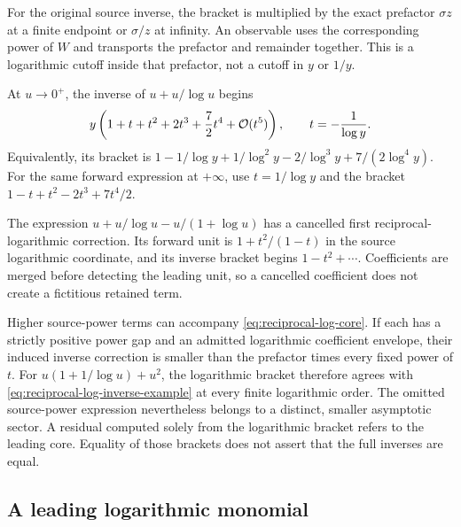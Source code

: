 For the original source inverse, the bracket is multiplied by the exact
prefactor $\sigma z$ at a finite endpoint or $\sigma/z$ at infinity.
An observable uses the corresponding power of $W$ and transports the
prefactor and remainder together. This is a logarithmic cutoff inside
that prefactor, not a cutoff in $y$ or $1/y$.

\begin{example}
At $u\to0^+$, the inverse of $u+u/\log u$ begins
\begin{equation}
 y\left(1+t+t^2+2t^3+\frac72t^4+\mathcal O(t^5)\right),
 \qquad t=-\frac1{\log y}.
 \label{eq:reciprocal-log-inverse-example}
\end{equation}
Equivalently, its bracket is
$1-1/\log y+1/\log^2y-2/\log^3y+7/(2\log^4y)$.
For the same forward expression at $+\infty$, use $t=1/\log y$ and the
bracket $1-t+t^2-2t^3+7t^4/2$.

The expression $u+u/\log u-u/(1+\log u)$ has a cancelled first
reciprocal-logarithmic correction. Its forward unit is
$1+t^2/(1-t)$ in the source logarithmic coordinate, and its inverse bracket
begins $1-t^2+\cdots$. Coefficients are merged before detecting the leading
unit, so a cancelled coefficient does not create a fictitious retained term.
\end{example}

Higher source-power terms can accompany \eqref{eq:reciprocal-log-core}.
If each has a strictly positive power gap and an admitted logarithmic
coefficient envelope, their induced inverse correction is smaller than
the prefactor times every fixed power of $t$. For
$u(1+1/\log u)+u^2$, the logarithmic bracket therefore agrees with
\eqref{eq:reciprocal-log-inverse-example} at every finite logarithmic
order. The omitted source-power expression nevertheless belongs to a
distinct, smaller asymptotic sector. A residual computed solely from the
logarithmic bracket refers to the leading core. Equality of those brackets
does not assert that the full inverses are equal.

\subsection{A leading logarithmic monomial}

